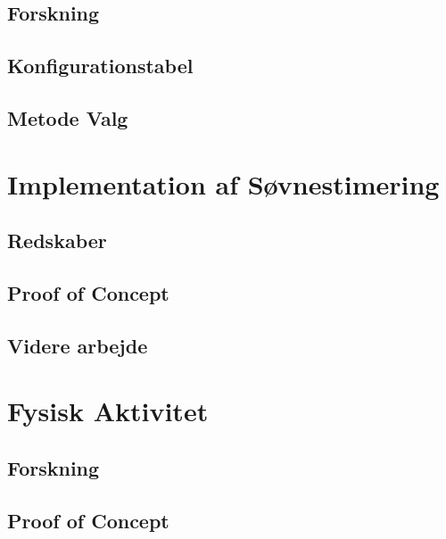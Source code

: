 \section{Forskning}

\section{Konfigurationstabel}

\section{Metode Valg}\label{sec:metodevalg}



\chapter{Implementation af Søvnestimering}

\section{Redskaber}\label{sec:redskaber}

\section{Proof of Concept}

\label{sec:verisoevn}
\section{Videre arbejde}\label{sec:videre-arbejde}









\chapter{Fysisk Aktivitet}

\section{Forskning}

\section{Proof of Concept}

